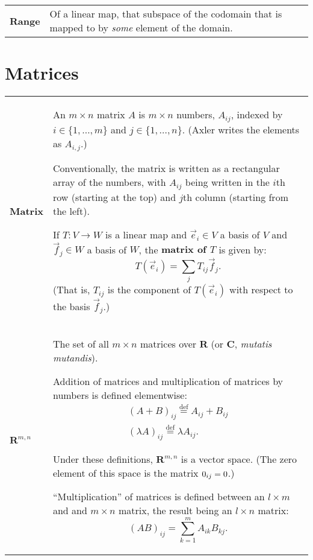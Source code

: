 \documentclass[10pt, a4paper, landscape]{article}
\newcommand{\defn}[1]{\textbf{#1}}
\newcommand{\isdef}{\stackrel{\text{def}}{=}}
\newcommand{\set}[1]{\mathbold{#1}}
\begin{document}
\begin{multicols*}{3}
\begin{tabularx}{\columnwidth}{@{}l>{\raggedright\arraybackslash}X@{}}
  \defn{Range} & Of a linear map, that subspace of the codomain that is mapped to by \emph{some} element of the domain.
  
\end{tabularx}


\section*{Matrices}
\begin{tabularx}{\columnwidth}{@{}l>{\raggedright\arraybackslash}X@{}}
  \toprule
  \defn{Matrix} & An $m\times n$ matrix $A$ is $m\times n$ numbers, $A_{ij}$, indexed by $i\in\{1,\dotsc, m\}$ and $j\in\{1,\dotsc, n\}$. (Axler writes the elements as $A_{i,j}$.)

  Conventionally, the matrix is written as a rectangular array of the
  numbers, with $A_{ij}$ being written in the $i$th row (starting at the
  top) and $j$th column (starting from the left).
  
  If $T\colon V\to W$ is a linear map and $\vec{e}_i\in V$ a basis of $V$ and $\vec{f}_j\in W$ a basis of $W$, the \defn{matrix of $T$} is given by:
  \begin{equation*}
    T(\vec{e}_i) = \sum_j T_{ij} \vec{f}_j.
  \end{equation*}
  (That is, $T_{ij}$ is the component of $T(\vec{e}_i)$ with respect to the basis $\vec{f}_j$.)
  \\
  
  $\set{R}^{m,n}$ & The set of all $m\times n$ matrices over $\set{R}$ (or $\set{C}$, \emph{mutatis mutandis}).

  Addition of matrices and multiplication of matrices by numbers is
  defined elementwise:
  \begin{equation*}
    \begin{gathered}
      (A+B)_{ij} \isdef A_{ij} + B_{ij} \\
      (\lambda A)_{ij} \isdef \lambda A_{ij}.
    \end{gathered}
  \end{equation*}

  Under these definitions, $\set{R}^{m,n}$ is a vector space. (The zero element of this space is the matrix $\boldmath{0}_{ij} = 0$.)
  
  “Multiplication” of matrices is defined between an $l\times m$ and and $m \times n$ matrix, the result being an $l\times n$ matrix:
  \begin{equation*}
    (AB)_{ij} = \sum_{k=1}^m A_{ik}B_{kj}.
  \end{equation*}
  \\
\end{tabularx}


\end{multicols*}
\end{document}
